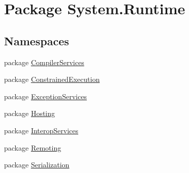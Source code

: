 \hypertarget{namespace_system_1_1_runtime}{\section{Package System.\-Runtime}
\label{namespace_system_1_1_runtime}
}
\subsection*{Namespaces}
\begin{DoxyCompactItemize}
\item 
package \hyperlink{namespace_system_1_1_runtime_1_1_compiler_services}{Compiler\-Services}
\item 
package \hyperlink{namespace_system_1_1_runtime_1_1_constrained_execution}{Constrained\-Execution}
\item 
package \hyperlink{namespace_system_1_1_runtime_1_1_exception_services}{Exception\-Services}
\item 
package \hyperlink{namespace_system_1_1_runtime_1_1_hosting}{Hosting}
\item 
package \hyperlink{namespace_system_1_1_runtime_1_1_interop_services}{Interop\-Services}
\item 
package \hyperlink{namespace_system_1_1_runtime_1_1_remoting}{Remoting}
\item 
package \hyperlink{namespace_system_1_1_runtime_1_1_serialization}{Serialization}
\end{DoxyCompactItemize}
